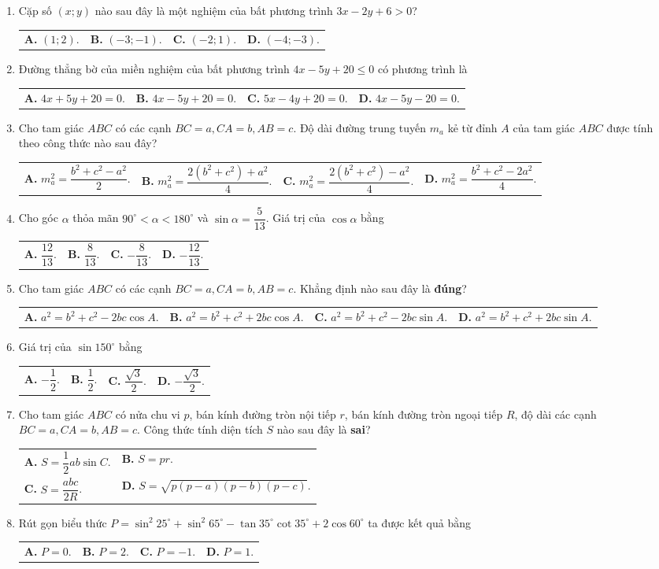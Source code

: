 \documentclass[12pt,a4paper]{article}
\makeatletter
\newcommand{\four}[4]{\par\noindent\begin{tabularx}{\linewidth}{@{}*{4}{>{\raggedright\arraybackslash}X}@{}}\textbf{A.} #1&\textbf{B.} #2&\textbf{C.} #3&\textbf{D.} #4\end{tabularx}}
\newcommand{\two}[4]{\par\noindent\begin{tabularx}{\linewidth}{@{}*{2}{>{\raggedright\arraybackslash}X}@{}}\textbf{A.} #1&\textbf{B.} #2\\[2pt]\textbf{C.} #3&\textbf{D.} #4\end{tabularx}}
\makeatother
\begin{document}
\begin{enumerate}
\item Cặp số $(x; y)$ nào sau đây là một nghiệm của bất phương trình $3x - 2y + 6 > 0$?
\four{$(1; 2)$.}{$(-3; -1)$.}{$(-2; 1)$.}{$(-4; -3)$.}

\item Đường thẳng bờ của miền nghiệm của bất phương trình $4x - 5y + 20 \le 0$ có phương trình là
\four{$4x + 5y + 20 = 0$.}{$4x - 5y + 20 = 0$.}{$5x - 4y + 20 = 0$.}{$4x - 5y - 20 = 0$.}

\item Cho tam giác $ABC$ có các cạnh $BC = a, CA = b, AB = c$. Độ dài đường trung tuyến $m_a$ kẻ từ đỉnh $A$ của tam giác $ABC$ được tính theo công thức nào sau đây?
\four{$m_a^2 = \dfrac{b^2 + c^2 - a^2}{2}$.}{$m_a^2 = \dfrac{2(b^2 + c^2) + a^2}{4}$.}{$m_a^2 = \dfrac{2(b^2 + c^2) - a^2}{4}$.}{$m_a^2 = \dfrac{b^2 + c^2 - 2a^2}{4}$.}

\item Cho góc $\alpha$ thỏa mãn $90^\circ < \alpha < 180^\circ$ và $\sin \alpha = \dfrac{5}{13}$. Giá trị của $\cos \alpha$ bằng
\four{$\dfrac{12}{13}$.}{$\dfrac{8}{13}$.}{$-\dfrac{8}{13}$.}{$-\dfrac{12}{13}$.}

\item Cho tam giác $ABC$ có các cạnh $BC = a, CA = b, AB = c$. Khẳng định nào sau đây là \textbf{đúng}?
\four{$a^2 = b^2 + c^2 - 2bc \cos A$.}{$a^2 = b^2 + c^2 + 2bc \cos A$.}{$a^2 = b^2 + c^2 - 2bc \sin A$.}{$a^2 = b^2 + c^2 + 2bc \sin A$.}

\item Giá trị của $\sin 150^\circ$ bằng
\four{$-\dfrac{1}{2}$.}{$\dfrac{1}{2}$.}{$\dfrac{\sqrt{3}}{2}$.}{$-\dfrac{\sqrt{3}}{2}$.}

\item Cho tam giác $ABC$ có nửa chu vi $p$, bán kính đường tròn nội tiếp $r$, bán kính đường tròn ngoại tiếp $R$, độ dài các cạnh $BC = a, CA = b, AB = c$. Công thức tính diện tích $S$ nào sau đây là \textbf{sai}?
\two{$S = \dfrac{1}{2}ab \sin C$.}{$S = pr$.}{$S = \dfrac{abc}{2R}$.}{$S = \sqrt{p(p-a)(p-b)(p-c)}$.}

\item Rút gọn biểu thức $P = \sin^2 25^\circ + \sin^2 65^\circ - \tan 35^\circ \cot 35^\circ + 2\cos 60^\circ$ ta được kết quả bằng
\four{$P = 0$.}{$P = 2$.}{$P = -1$.}{$P = 1$.}
\end{enumerate}
\end{document}
